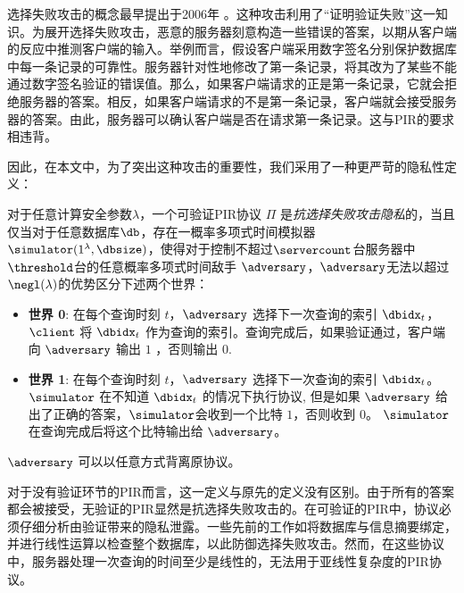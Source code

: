 选择失败攻击的概念最早提出于2006年 \cite{Kiraz2006API}。这种攻击利用了“证明验证失败”这一知识。为展开选择失败攻击，恶意的服务器刻意构造一些错误的答案，以期从客户端的反应中推测客户端的输入。举例而言，假设客户端采用数字签名分别保护数据库中每一条记录的可靠性。服务器针对性地修改了第一条记录，将其改为了某些不能通过数字签名验证的错误值。那么，如果客户端请求的正是第一条记录，它就会拒绝服务器的答案。相反，如果客户端请求的不是第一条记录，客户端就会接受服务器的答案。由此，服务器可以确认客户端是否在请求第一条记录。这与PIR的要求相违背。

因此，在本文中，为了突出这种攻击的重要性，我们采用了一种更严苛的隐私性定义：

\begin{definition}[抗选择失败攻击的隐私性]
    \label{def:privacy-sfa}
    对于任意计算安全参数$\lambda$，一个可验证PIR协议 $\Pi$ 是\textit{抗选择失败攻击隐私}的，当且仅当对于任意数据库$\db$，存在一概率多项式时间模拟器 $\simulator(1^\lambda, \dbsize)$，使得对于控制不超过$\servercount$台服务器中$\threshold$台的任意概率多项式时间敌手 $\adversary$，$\adversary$无法以超过 $\negl(\lambda)$的优势区分下述两个世界：
    \begin{itemize}
        \item \textbf{世界 0}: 在每个查询时刻 $t$，$\adversary$ 选择下一次查询的索引 $\dbidx_t$， $\client$ 将 $\dbidx_t$ 作为查询的索引。查询完成后，如果验证通过，客户端向 $\adversary$ 输出 $1$ ，否则输出 $0$.
        \item \textbf{世界 1}: 在每个查询时刻 $t$，$\adversary$ 选择下一次查询的索引 $\dbidx_t$。$\simulator$ 在不知道  $\dbidx_t$ 的情况下执行协议, 但是如果 $\adversary$ 给出了正确的答案，$\simulator$会收到一个比特 $1$，否则收到 $0$。 $\simulator$ 在查询完成后将这个比特输出给 $\adversary$。
    \end{itemize}

    $\adversary$ 可以以任意方式背离原协议。
\end{definition}

对于没有验证环节的PIR而言，这一定义与原先的定义没有区别。由于所有的答案都会被接受，无验证的PIR显然是抗选择失败攻击的。在可验证的PIR中，协议必须仔细分析由验证带来的隐私泄露。一些先前的工作如\cite{APIR, VeriSimplePIR}将数据库与信息摘要绑定，并进行线性运算以检查整个数据库，以此防御选择失败攻击。然而，在这些协议中，服务器处理一次查询的时间至少是线性的，无法用于亚线性复杂度的PIR协议。